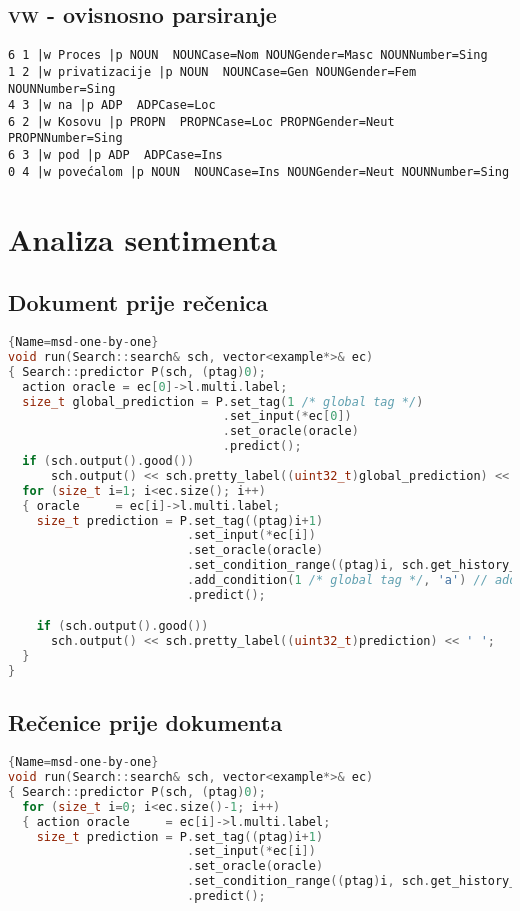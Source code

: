 \begin{appendix}
\section{\textsc{vw} - ovisnosno parsiranje}
\begin{lstlisting}[basicstyle=\scriptsize\ttfamily]
6 1 |w Proces |p NOUN  NOUNCase=Nom NOUNGender=Masc NOUNNumber=Sing
1 2 |w privatizacije |p NOUN  NOUNCase=Gen NOUNGender=Fem NOUNNumber=Sing
4 3 |w na |p ADP  ADPCase=Loc
6 2 |w Kosovu |p PROPN  PROPNCase=Loc PROPNGender=Neut PROPNNumber=Sing
6 3 |w pod |p ADP  ADPCase=Ins
0 4 |w povećalom |p NOUN  NOUNCase=Ins NOUNGender=Neut NOUNNumber=Sing
\end{lstlisting}

\chapter{Analiza sentimenta}\label{appendix:sentiment}
\section{Dokument prije rečenica}
\begin{lstlisting}[language=C++,
                   basicstyle=\scriptsize\ttfamily]{Name=msd-one-by-one}
void run(Search::search& sch, vector<example*>& ec)
{ Search::predictor P(sch, (ptag)0);
  action oracle = ec[0]->l.multi.label;
  size_t global_prediction = P.set_tag(1 /* global tag */)
                              .set_input(*ec[0])
                              .set_oracle(oracle)
                              .predict();
  if (sch.output().good())
      sch.output() << sch.pretty_label((uint32_t)global_prediction) << ' ';
  for (size_t i=1; i<ec.size(); i++)
  { oracle     = ec[i]->l.multi.label;
    size_t prediction = P.set_tag((ptag)i+1)
                         .set_input(*ec[i])
                         .set_oracle(oracle)
                         .set_condition_range((ptag)i, sch.get_history_length(), 'p')
                         .add_condition(1 /* global tag */, 'a') // adds the global as condition on each sequence element
                         .predict();

    if (sch.output().good())
      sch.output() << sch.pretty_label((uint32_t)prediction) << ' ';
  }
}
\end{lstlisting}
\section{Rečenice prije dokumenta}
\begin{lstlisting}[language=C++,
                   basicstyle=\scriptsize\ttfamily]{Name=msd-one-by-one}
void run(Search::search& sch, vector<example*>& ec)
{ Search::predictor P(sch, (ptag)0);
  for (size_t i=0; i<ec.size()-1; i++)
  { action oracle     = ec[i]->l.multi.label;
    size_t prediction = P.set_tag((ptag)i+1)
                         .set_input(*ec[i])
                         .set_oracle(oracle)
                         .set_condition_range((ptag)i, sch.get_history_length(), 'p')
                         .predict();


\end{lstlisting}
\end{appendix}
